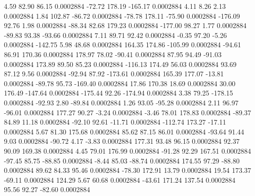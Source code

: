         4.59       82.90       86.15     0.0002884
      -72.72      178.19     -165.17     0.0002884
        4.11        8.26        2.13     0.0002884
        1.84      102.87      -86.72     0.0002884
      -78.78      178.11      -75.90     0.0002884
     -176.09       92.76        1.98     0.0002884
      -88.34       82.68      179.23     0.0002884
     -177.00       98.27        1.77     0.0002884
      -89.83       93.38      -93.66     0.0002884
        7.11       89.71       92.42     0.0002884
       -0.35       97.20       -5.26     0.0002884
     -142.75        5.98       48.68     0.0002884
      164.35      174.86     -105.99     0.0002884
      -94.61       86.91      170.36     0.0002884
      178.97       78.02      -90.41     0.0002884
       87.95       94.49      -91.03     0.0002884
      173.89       89.50       85.23     0.0002884
     -116.13      174.49       56.03     0.0002884
       93.69       87.12        9.56     0.0002884
      -92.94       87.92     -173.61     0.0002884
      165.39      177.07      -13.81     0.0002884
      -89.78       95.73     -169.40     0.0002884
       17.86      170.38       18.69     0.0002884
       30.00      176.49     -147.64     0.0002884
     -175.44       92.26     -174.94     0.0002884
        3.38       79.25     -178.15     0.0002884
      -92.93        2.80      -89.84     0.0002884
        1.26       93.05      -95.28     0.0002884
        2.11       96.97      -96.01     0.0002884
      177.27       90.27       -3.24     0.0002884
       -3.46       78.01      178.83     0.0002884
      -89.37       84.89       11.18     0.0002884
      -92.10       92.61      -11.71     0.0002884
     -112.74      173.27      -17.11     0.0002884
        5.67       81.30      175.68     0.0002884
       85.62       87.15       86.01     0.0002884
      -93.64       91.44        9.03     0.0002884
      -90.72        4.17       -3.83     0.0002884
      177.31       93.48       96.15     0.0002884
       92.37       90.09      169.38     0.0002884
        4.45       79.01      176.99     0.0002884
      -91.28       92.29      167.51     0.0002884
      -97.45       85.75      -88.85     0.0002884
       -8.44       85.03      -88.74     0.0002884
      174.55       97.29      -88.80     0.0002884
       89.62       84.33       95.46     0.0002884
      -78.30      172.91       13.79     0.0002884
       19.54      173.37      -69.11     0.0002884
      124.29        5.67       60.68     0.0002884
      -43.61      171.24      137.54     0.0002884
       95.56       92.27      -82.60     0.0002884
